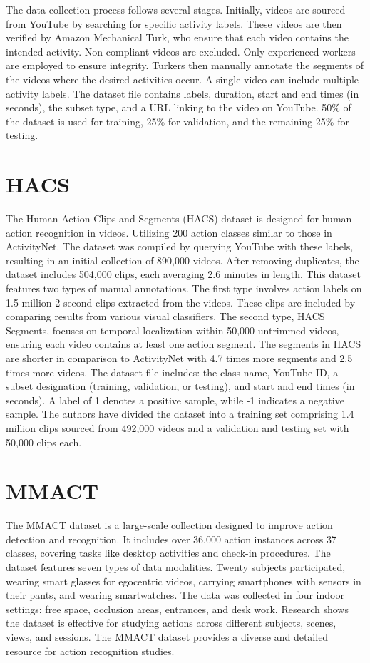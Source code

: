 The data collection process follows several stages. Initially, videos are sourced from YouTube by searching for specific activity labels. These videos are then verified by Amazon Mechanical Turk, who ensure that each video contains the intended activity. Non-compliant videos are excluded.  Only experienced workers are employed to ensure integrity. Turkers then manually annotate the segments of the videos where the desired activities occur. A single video can include multiple activity labels. The dataset file contains labels, duration, start and end times (in seconds), the subset type, and a URL linking to the video on YouTube. 50\% of the dataset is used for training, 25\% for validation, and the remaining 25\% for testing.

\section{HACS}
The Human Action Clips and Segments (HACS) dataset \parencite{HACS} is designed for human action recognition in videos. Utilizing 200 action classes similar to those in ActivityNet. The dataset was compiled by querying YouTube with these labels, resulting in an initial collection of 890,000 videos. After removing duplicates, the dataset includes 504,000 clips, each averaging 2.6 minutes in length.
This dataset features two types of manual annotations. The first type involves action labels on 1.5 million 2-second clips extracted from the videos. These clips are included by comparing results from various visual classifiers. The second type, HACS Segments, focuses on temporal localization within 50,000 untrimmed videos, ensuring each video contains at least one action segment. The segments in HACS are shorter in comparison to ActivityNet with 4.7 times more segments and 2.5 times more videos.
The dataset file includes: the class name, YouTube ID, a subset designation (training, validation, or testing), and start and end times (in seconds). A label of 1 denotes a positive sample, while -1 indicates a negative sample.
The authors have divided the dataset into a training set comprising 1.4 million clips sourced from 492,000 videos and a validation and testing set with 50,000 clips each.

\section{MMACT}
The MMACT dataset \parencite{MMAct} is a large-scale collection designed to improve action detection and recognition. It includes over 36,000 action instances across 37 classes, covering tasks like desktop activities and check-in procedures. The dataset features seven types of data modalities. Twenty subjects participated, wearing smart glasses for egocentric videos, carrying smartphones with sensors in their pants, and wearing smartwatches. The data was collected in four indoor settings: free space, occlusion areas, entrances, and desk work. Research shows the dataset is effective for studying actions across different subjects, scenes, views, and sessions. The MMACT dataset provides a diverse and detailed resource for action recognition studies.

